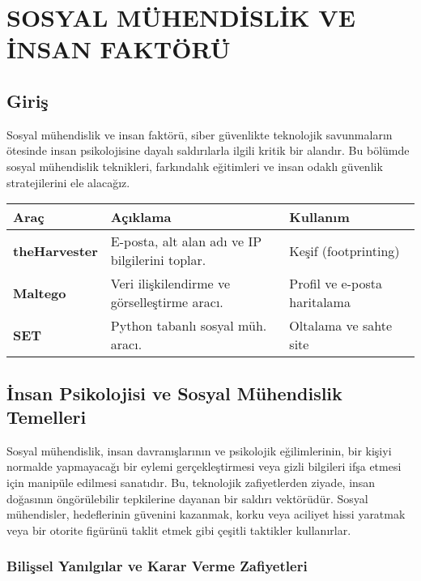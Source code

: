 ﻿\chapter{SOSYAL MÜHENDİSLİK VE İNSAN FAKTÖRÜ}

\section*{Giriş}
Sosyal mühendislik ve insan faktörü, siber güvenlikte teknolojik savunmaların ötesinde insan psikolojisine dayalı saldırılarla ilgili kritik bir alandır. Bu bölümde sosyal mühendislik teknikleri, farkındalık eğitimleri ve insan odaklı güvenlik stratejilerini ele alacağız.

\begin{center}
\begin{tabularx}{\textwidth}{|p{4cm}|X|p{4cm}|}
\hline
\rowcolor{tableheadcolor}
\textbf{Araç} & \textbf{Açıklama} & \textbf{Kullanım}  \\
\hline
\textbf{theHarvester} & E-posta, alt alan adı ve IP bilgilerini toplar. & Keşif (footprinting)  \\
\hline
\textbf{Maltego} & Veri ilişkilendirme ve görselleştirme aracı. & Profil ve e-posta haritalama  \\
\hline
\textbf{SET} & Python tabanlı sosyal müh. aracı. & Oltalama ve sahte site  \\
\hline
\end{tabularx}
\end{center}

\section{İnsan Psikolojisi ve Sosyal Mühendislik Temelleri}

Sosyal mühendislik, insan davranışlarının ve psikolojik eğilimlerinin, bir kişiyi normalde yapmayacağı bir eylemi gerçekleştirmesi veya gizli bilgileri ifşa etmesi için manipüle edilmesi sanatıdır. Bu, teknolojik zafiyetlerden ziyade, insan doğasının öngörülebilir tepkilerine dayanan bir saldırı vektörüdür. Sosyal mühendisler, hedeflerinin güvenini kazanmak, korku veya aciliyet hissi yaratmak veya bir otorite figürünü taklit etmek gibi çeşitli taktikler kullanırlar.

\subsection{Bilişsel Yanılgılar ve Karar Verme Zafiyetleri}

